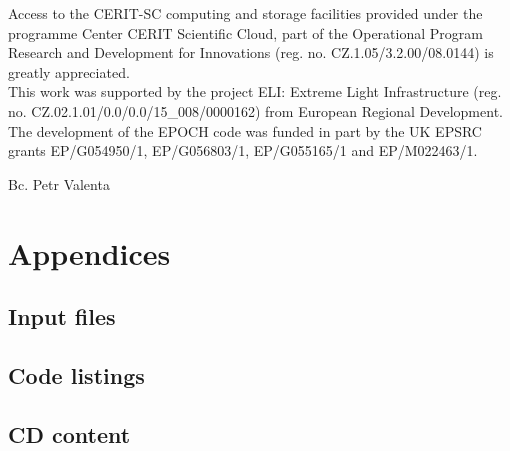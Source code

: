 \documentclass[12pt, twoside, a4paper, openright]{report}
\newcommand{\valenta}{Bc. Petr Valenta }
\begin{document}
Access to the CERIT-SC computing and storage facilities provided under the programme Center CERIT Scientific Cloud, part of the Operational Program Research and Development for Innovations (reg. no. CZ.1.05/3.2.00/08.0144) is greatly  appreciated.\\

This work was supported by the project ELI: Extreme Light Infrastructure (reg. no. CZ.02.1.01/0.0/0.0/15\_008/0000162) from European Regional Development.\\

The development of the EPOCH code was funded in part by the UK EPSRC grants EP/G054950/1, EP/G056803/1, EP/G055165/1 and EP/M022463/1.\\
\begin{flushright}
\valenta
\end{flushright}


\newpage
{}




\part*{Appendices}

\appendix

\chapter{Input files}


\chapter{Code listings}


\chapter{CD content}

\end{document}
